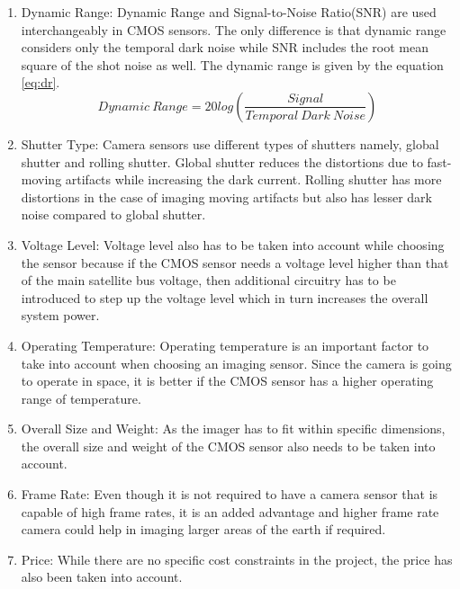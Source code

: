 \begin{enumerate}
\item Dynamic Range: Dynamic Range and Signal-to-Noise Ratio(SNR) are used interchangeably in CMOS sensors. The only difference is that dynamic range considers only the temporal dark noise while SNR includes the root mean square of the shot noise as well.  The dynamic range is given by the equation \ref{eq:dr}.
\begin{equation}
\label{eq:dr}
Dynamic \ Range = 20log(\frac{Signal}{Temporal \ Dark \ Noise})
\end{equation}

\item Shutter Type: Camera sensors use different types of shutters namely, global shutter and rolling shutter. Global shutter reduces the distortions due to fast-moving artifacts while increasing the dark current. Rolling shutter has more distortions in the case of imaging moving artifacts but also has lesser dark noise compared to global shutter. 

\item Voltage Level: Voltage level also has to be taken into account while choosing the sensor because if the CMOS sensor needs a voltage level higher than that of the main satellite bus voltage, then additional circuitry has to be introduced to step up the voltage level which in turn increases the overall system power.  

\item Operating Temperature: Operating temperature is an important factor to take into account when choosing an imaging sensor. Since the camera is going to operate in space, it is better if the CMOS sensor has a higher operating range of temperature. 

\item Overall Size and Weight: As the imager has to fit within specific dimensions, the overall size and weight of the CMOS sensor also needs to be taken into account.

\item Frame Rate: Even though it is not required to have a camera sensor that is capable of high frame rates, it is an added advantage and higher frame rate camera could help in imaging larger areas of the earth if required. 
\item Price: While there are no specific cost constraints in the project, the price has also been taken into account.
\end{enumerate}

